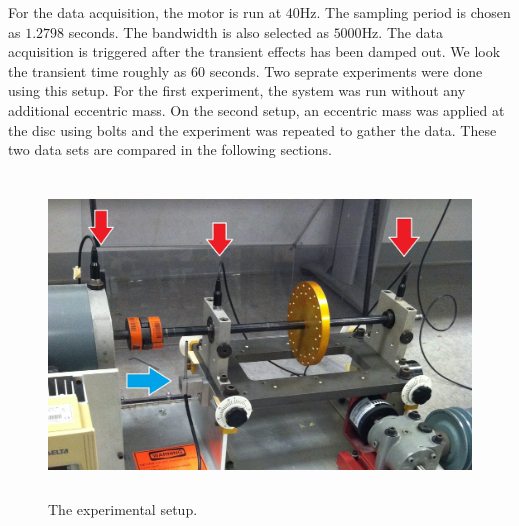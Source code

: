 \documentclass[paper=a4, fontsize=12pt]{scrartcl} %
\begin{document}
For the data acquisition, the motor is run at $40$Hz. The sampling period is chosen as $1.2798$ seconds. The bandwidth is also selected as $5000$Hz. The data acquisition is triggered after the transient effects has been damped out. We look the transient time roughly as $60$ seconds. Two seprate experiments were done using this setup. For the first experiment, the system was run without any additional eccentric mass. On the second setup, an eccentric mass was applied at the disc using bolts and the experiment was repeated to gather the data. These two data sets are compared in the following sections.
%
\begin{figure}[H]
	\centering
	\includegraphics[height = 8.5cm]{setup.jpg}
	\caption{The experimental setup.}
	\label{fig:experimentalSetup}
\end{figure}
%
\end{document}
